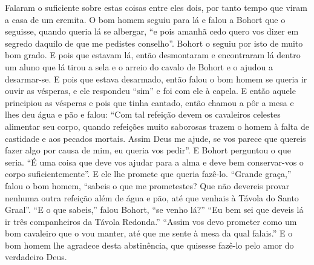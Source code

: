 Falaram o suficiente sobre estas coisas entre eles dois, por tanto tempo que
viram a casa de um eremita. O bom homem seguiu para lá e falou a Bohort que o
seguisse, quando queria lá se albergar, “e pois amanhã cedo quero vos dizer em
segredo daquilo de que me pedistes conselho”. Bohort o seguiu por isto de muito
bom grado. E pois que estavam lá, então desmontaram e encontraram lá dentro um
aluno que lá tirou a sela e o arreio do cavalo de Bohort e o ajudou a
desarmar-se. E pois que estava desarmado, então falou o bom homem se queria ir
ouvir as vésperas, e ele respondeu “sim” e foi com ele à capela. E então aquele
principiou as vésperas e pois que tinha cantado, então chamou a pôr a mesa e
lhes deu água e pão e falou: ``Com tal refeição devem os cavaleiros celestes
alimentar seu corpo, quando refeições muito saborosas trazem o homem à falta de
castidade e aos pecados mortais. Assim Deus me ajude, se vos parece
que quereis fazer algo por causa de mim, eu queria vos pedir”. E Bohort
perguntou o que seria. “É uma coisa que deve vos ajudar para a alma e deve bem
conservar-vos o corpo suficientemente”. E ele lhe promete que queria fazê-lo.
“Grande graça,” falou o bom homem, “sabeis o que me prometestes? Que não
devereis provar nenhuma outra refeição além de água e pão, até que venhais à
Távola do Santo Graal”. “E o que sabeis,” falou Bohort, “se venho
lá?” “Eu bem sei que deveis lá ir três companheiros da Távola Redonda.” “Assim
vos devo prometer como um bom cavaleiro que o vou manter, até que me sente à
mesa da qual falais.” E o bom homem lhe agradece desta abstinência,
que quisesse fazê-lo pelo amor do verdadeiro Deus.

